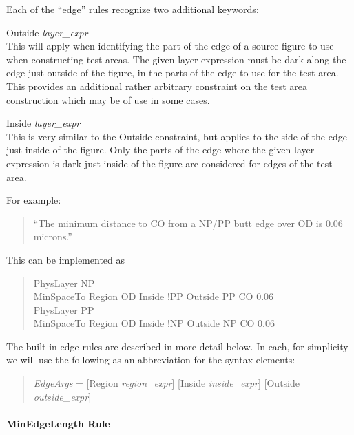 Each of the ``edge'' rules recognize two additional keywords:
\begin{description}
\item{\vt Outside} {\it layer\_expr}\\
This will apply when identifying the part of the edge of a source
figure to use when constructing test areas.  The given layer
expression must be dark along the edge just outside of the figure, in
the parts of the edge to use for the test area.  This provides an
additional rather arbitrary constraint on the test area construction
which may be of use in some cases.

\item{\vt Inside} {\it layer\_expr}\\
This is very similar to the {\vt Outside} constraint, but applies to
the side of the edge just inside of the figure.  Only the parts of the
edge where the given layer expression is dark just inside of the
figure are considered for edges of the test area.
\end{description}

For example:
\begin{quote}
``The minimum distance to CO from a NP/PP butt edge over OD is 0.06
microns.''
\end{quote}

This can be implemented as
\begin{quote} \vt
PhysLayer NP\\
MinSpaceTo Region OD Inside !PP Outside PP CO 0.06\\
PhysLayer PP\\
MinSpaceTo Region OD Inside !NP Outside NP CO 0.06
\end{quote}

The built-in edge rules are described in more detail below.  In each,
for simplicity we will use the following as an abbreviation for the
syntax elements:
\begin{quote}
{\it EdgeArgs} = [{\vt Region} {\it region\_expr\/}]
[{\vt Inside} {\it inside\_expr\/}]
[{\vt Outside} {\it outside\_expr\/}]
\end{quote}

\paragraph{{\et MinEdgeLength} Rule}


